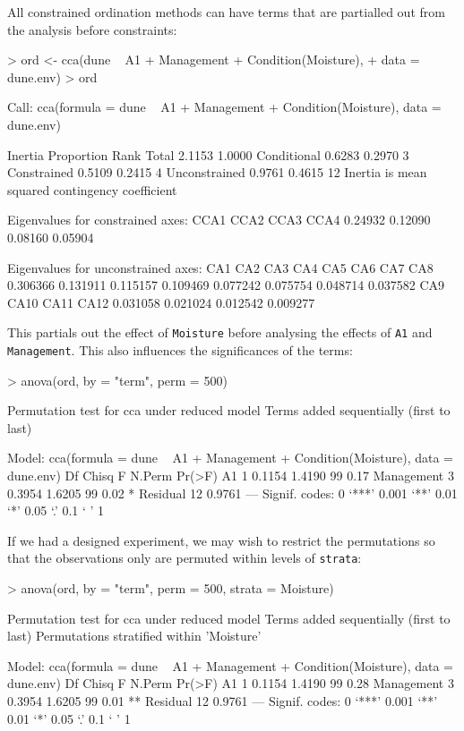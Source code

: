 \documentclass[a4paper,10pt]{amsart}
\begin{document}
All constrained ordination methods can have terms that are partialled
out from the analysis before constraints:
\begin{Schunk}
\begin{Sinput}
> ord <- cca(dune ~ A1 + Management + Condition(Moisture), 
+     data = dune.env)
> ord
\end{Sinput}
\begin{Soutput}
Call: cca(formula = dune ~ A1 + Management +
Condition(Moisture), data = dune.env)

              Inertia Proportion Rank
Total          2.1153     1.0000     
Conditional    0.6283     0.2970    3
Constrained    0.5109     0.2415    4
Unconstrained  0.9761     0.4615   12
Inertia is mean squared contingency coefficient 

Eigenvalues for constrained axes:
   CCA1    CCA2    CCA3    CCA4 
0.24932 0.12090 0.08160 0.05904 

Eigenvalues for unconstrained axes:
     CA1      CA2      CA3      CA4      CA5      CA6      CA7      CA8 
0.306366 0.131911 0.115157 0.109469 0.077242 0.075754 0.048714 0.037582 
     CA9     CA10     CA11     CA12 
0.031058 0.021024 0.012542 0.009277 
\end{Soutput}
\end{Schunk}
This partials out the effect of \texttt{Moisture} before analysing the
effects of \texttt{A1} and \texttt{Management}.  This also influences
the significances of the terms:
\begin{Schunk}
\begin{Sinput}
> anova(ord, by = "term", perm = 500)
\end{Sinput}
\begin{Soutput}
Permutation test for cca under reduced model
Terms added sequentially (first to last)

Model: cca(formula = dune ~ A1 + Management + Condition(Moisture), data = dune.env)
           Df  Chisq      F N.Perm Pr(>F)  
A1          1 0.1154 1.4190     99   0.17  
Management  3 0.3954 1.6205     99   0.02 *
Residual   12 0.9761                       
---
Signif. codes:  0 ‘***’ 0.001 ‘**’ 0.01 ‘*’ 0.05 ‘.’ 0.1 ‘ ’ 1 
\end{Soutput}
\end{Schunk}
If we had a designed experiment, we may wish to restrict the
permutations so that the observations only are permuted within levels
of \texttt{strata}:
\begin{Schunk}
\begin{Sinput}
> anova(ord, by = "term", perm = 500, strata = Moisture)
\end{Sinput}
\begin{Soutput}
Permutation test for cca under reduced model
Terms added sequentially (first to last)
Permutations stratified within 'Moisture'

Model: cca(formula = dune ~ A1 + Management + Condition(Moisture), data = dune.env)
           Df  Chisq      F N.Perm Pr(>F)   
A1          1 0.1154 1.4190     99   0.28   
Management  3 0.3954 1.6205     99   0.01 **
Residual   12 0.9761                        
---
Signif. codes:  0 ‘***’ 0.001 ‘**’ 0.01 ‘*’ 0.05 ‘.’ 0.1 ‘ ’ 1 
\end{Soutput}
\end{Schunk}

\end{document}
